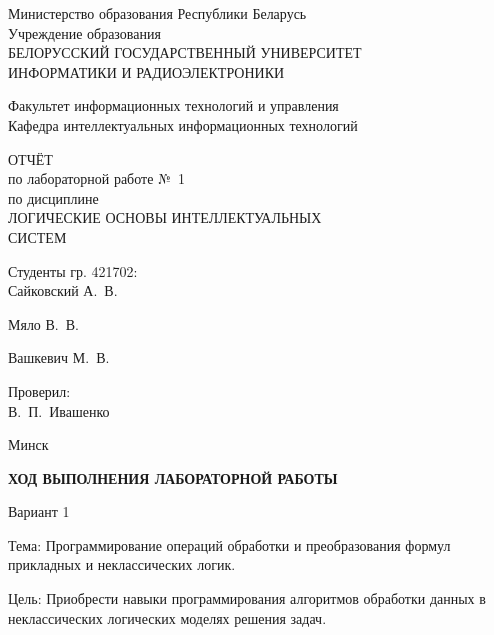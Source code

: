 \documentclass[14pt,a4paper]{extarticle}
\newcommand{\studentgroup}{421702}
\newcommand{\studentone}{Сайковский А.~В.}
\newcommand{\studenttwo}{Мяло В.~В.}
\newcommand{\studentthree}{Вашкевич М.~В.}
\newcommand{\teachername}{В.~П.~Ивашенко}
\begin{document}

\begin{titlepage}
\thispagestyle{empty}
\begin{center}
Министерство образования Республики Беларусь\\[2mm]
Учреждение образования\\
БЕЛОРУССКИЙ ГОСУДАРСТВЕННЫЙ УНИВЕРСИТЕТ\\
ИНФОРМАТИКИ И РАДИОЭЛЕКТРОНИКИ
\end{center}
\vspace{2.8cm}
\noindent Факультет информационных технологий и управления\\
\noindent Кафедра интеллектуальных информационных технологий
\vfill
\begin{center}
ОТЧЁТ\\[2mm]
по лабораторной работе №~1\\
по дисциплине\\[2mm]
ЛОГИЧЕСКИЕ ОСНОВЫ ИНТЕЛЛЕКТУАЛЬНЫХ\\
СИСТЕМ
\end{center}
\vfill
\noindent
\begin{minipage}[t]{0.57\textwidth}
Студенты гр. \studentgroup:\\[3mm]
\studentone

\studenttwo

\studentthree
\end{minipage}
\hfill
\begin{minipage}[t]{0.40\textwidth}
\raggedleft
Проверил:\\[3mm]
\teachername
\end{minipage}
\vfill
\begin{center}
Минск \the\year
\end{center}
\end{titlepage}

\setcounter{page}{2}
\begin{center}
\textbf{ХОД ВЫПОЛНЕНИЯ ЛАБОРАТОРНОЙ РАБОТЫ}
\end{center}
\begin{center}
Вариант 1
\end{center}

\noindent Тема: Программирование операций обработки и преобразования формул прикладных и неклассических логик.

\noindent Цель: Приобрести навыки программирования алгоритмов обработки данных в неклассических логических моделях решения задач.
\end{document}
